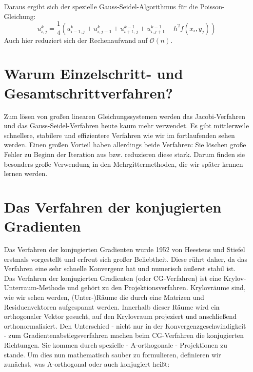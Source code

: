 Daraus ergibt sich der spezielle Gauss-Seidel-Algorithmus für die Poisson-Gleichung:
\begin{equation}
u^{k}_{i,j} =   \frac {1} {4} (u^{k}_{i-1,j} + u^{k}_{i,j-1} + u^{k-1}_{i+1,j} + u^{k-1}_{i,j+1} - h^{2}f(x_{i},y_{j}))
\end{equation}
Auch hier reduziert sich der Rechenaufwand auf $\mathcal{O}(n)$.


\section{Warum Einzelschritt- und Gesamtschrittverfahren?}\label{s.Warum Einzelschritt- und Gesamtschrittverfahren?}
Zum lösen von großen linearen Gleichungssystemen werden das Jacobi-Verfahren und das Gauss-Seidel-Verfahren heute kaum mehr verwendet. Es gibt mittlerweile schnellere, stabilere und effizientere Verfahren wie wir im fortlaufenden sehen werden. Einen großen Vorteil haben allerdings beide Verfahren: Sie löschen große Fehler zu Beginn der Iteration aus bzw. reduzieren diese stark. Darum finden sie besonders große Verwendung in den Mehrgittermethoden, die wir später kennen lernen werden.

\section{Das Verfahren der konjugierten Gradienten}\label{s.Das Verfahren der konjugierten Gradienten}

Das Verfahren der konjugierten Gradienten wurde 1952 von Heestens und Stiefel erstmals vorgestellt und erfreut sich großer Beliebtheit. Diese rührt daher, da das Verfahren eine sehr schnelle Konvergenz hat und numerisch äußerst stabil ist. \\
Das Verfahren der konjugierten Gradienten (oder CG-Verfahren) ist eine Krylov-Unterraum-Methode und gehört zu den Projektionsverfahren. Krylovräume sind, wie wir sehen werden, (Unter-)Räume die durch eine Matrizen und Residuenvektoren aufgespannt werden. Innerhalb dieser Räume wird ein orthogonaler Vektor gesucht, auf den Krylovraum projeziert und anschließend orthonormalisiert. Den Unterschied - nicht nur in der Konvergenzgeschwindigkeit - zum Gradientenabstiegsverfahren machen beim CG-Verfahren die konjugierten Richtungen. Sie kommen durch spezielle - A-orthogonale - Projektionen zu stande. Um dies nun mathematisch sauber zu formulieren, definieren wir zunächst, was A-orthogonal oder auch konjugiert heißt: 

